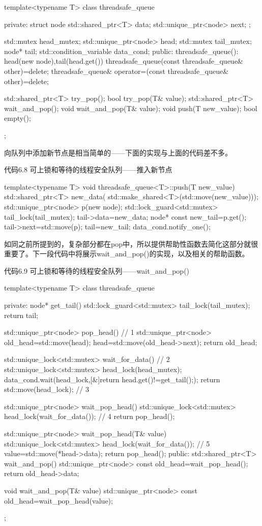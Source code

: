 \begin{cpp}
template<typename T>
class threadsafe_queue
{
private:
  struct node
  {
    std::shared_ptr<T> data;
    std::unique_ptr<node> next;
  };

  std::mutex head_mutex;
  std::unique_ptr<node> head;
  std::mutex tail_mutex;
  node* tail;
  std::condition_variable data_cond;
public:
  threadsafe_queue():
    head(new node),tail(head.get())
  {}
  threadsafe_queue(const threadsafe_queue& other)=delete;
  threadsafe_queue& operator=(const threadsafe_queue& other)=delete;

  std::shared_ptr<T> try_pop();
  bool try_pop(T& value);
  std::shared_ptr<T> wait_and_pop();
  void wait_and_pop(T& value);
  void push(T new_value);
  bool empty();
};
\end{cpp}

向队列中添加新节点是相当简单的——下面的实现与上面的代码差不多。

代码6.8 可上锁和等待的线程安全队列——推入新节点

\begin{cpp}
template<typename T>
void threadsafe_queue<T>::push(T new_value)
{
  std::shared_ptr<T> new_data(
  std::make_shared<T>(std::move(new_value)));
  std::unique_ptr<node> p(new node);
  {
    std::lock_guard<std::mutex> tail_lock(tail_mutex);
    tail->data=new_data;
    node* const new_tail=p.get();
    tail->next=std::move(p);
    tail=new_tail;
  }
  data_cond.notify_one();
}
\end{cpp}

如同之前所提到的，复杂部分都在pop中，所以提供帮助性函数去简化这部分就很重要了。下一段代码中将展示wait\_and\_pop()的实现，以及相关的帮助函数。

代码6.9 可上锁和等待的线程安全队列——wait\_and\_pop()

\begin{cpp}
template<typename T>
class threadsafe_queue
{
private:
  node* get_tail()
  {
    std::lock_guard<std::mutex> tail_lock(tail_mutex);
    return tail;
  }

  std::unique_ptr<node> pop_head()  // 1
  {
    std::unique_ptr<node> old_head=std::move(head);
    head=std::move(old_head->next);
    return old_head;
  }

  std::unique_lock<std::mutex> wait_for_data()  // 2
  {
    std::unique_lock<std::mutex> head_lock(head_mutex);
    data_cond.wait(head_lock,[&]{return head.get()!=get_tail();});
    return std::move(head_lock);  // 3
  }

  std::unique_ptr<node> wait_pop_head()
  {
    std::unique_lock<std::mutex> head_lock(wait_for_data());  // 4
    return pop_head();
  }

  std::unique_ptr<node> wait_pop_head(T& value)
  {
    std::unique_lock<std::mutex> head_lock(wait_for_data());  // 5
    value=std::move(*head->data);
    return pop_head();
  }
public:
  std::shared_ptr<T> wait_and_pop()
  {
    std::unique_ptr<node> const old_head=wait_pop_head();
    return old_head->data;
  }

  void wait_and_pop(T& value)
  {
    std::unique_ptr<node> const old_head=wait_pop_head(value);
  }
};
\end{cpp}

